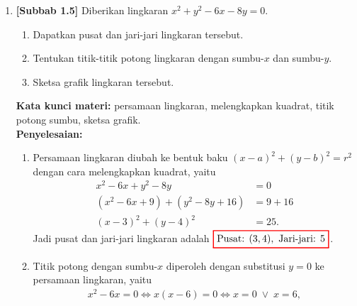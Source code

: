 \documentclass[10pt,openany,a4paper]{article}
\theoremstyle{definition}
\theoremstyle{definition}
\theoremstyle{plain}
\newenvironment{jawab}[2][tes]{%
\par\noindent\textbf{Kata kunci materi:} #1.\\
\textbf{Penyelesaian:} #2%
}{}
\begin{document}
\begin{enumerate}
\begin{jawab}[pertidaksamaan rasional, pertidaksamaan ganda, garis bilangan, irisan himpunan]
{\begin{enumerate}
        \end{enumerate}
        Himpunan penyelesaian pertidaksamaan ganda adalah irisan dari kedua himpunan tersebut, yaitu
        \begin{align*}
            HP_1\cap HP_2 = \big((0,1]\cup[2,\infty)\big)\cap\big((-\infty,0)\cup(1,\infty)\big) = [2,\infty).
        \end{align*}
        Sebagai pengecekan, untuk $x=2$ diperoleh $\frac{4+2}{2}=3$, dan berlaku $3\leq 3<4$. Jadi himpunan penyelesaiannya adalah $\colorlet{oldcolor}{.}
        \color{red}
        \setlength{\fboxrule}{1pt} \boxed{\color{oldcolor}\{x\in\mathbb{R} : x\geq 2\}=[2,\infty)}\color{oldcolor}$.
    }
    \end{jawab}

    \item \textbf{[Subbab 1.5]} Diberikan lingkaran $x^2+y^2-6x-8y=0$.
    \begin{enumerate}
        \item Dapatkan pusat dan jari-jari lingkaran tersebut.
        \item Tentukan titik-titik potong lingkaran dengan sumbu-$x$ dan sumbu-$y$.
        \item Sketsa grafik lingkaran tersebut.
    \end{enumerate}
    \begin{jawab}[persamaan lingkaran, melengkapkan kuadrat, titik potong sumbu, sketsa grafik]{
        \begin{enumerate}
            \item Persamaan lingkaran diubah ke bentuk baku $(x-a)^2+(y-b)^2=r^2$ dengan cara melengkapkan kuadrat, yaitu
            \begin{align*}
                x^2-6x+y^2-8y &= 0\\
                (x^2-6x+9)+(y^2-8y+16) &= 9+16\\
                (x-3)^2+(y-4)^2 &= 25.
            \end{align*}
            Jadi pusat dan jari-jari lingkaran adalah $\colorlet{oldcolor}{.}
        \color{red}
        \setlength{\fboxrule}{1pt} \boxed{\color{oldcolor}\text{Pusat: }(3,4),~\text{Jari-jari: }5}\color{oldcolor}$.
            \item Titik potong dengan sumbu-$x$ diperoleh dengan substitusi $y=0$ ke persamaan lingkaran, yaitu
            \begin{align*}
                x^2-6x=0 \iff x(x-6)=0 \iff x=0 \;\vee\; x=6,
            \end{align*}

\end{enumerate}}
\end{jawab}
\end{enumerate}
\end{document}
